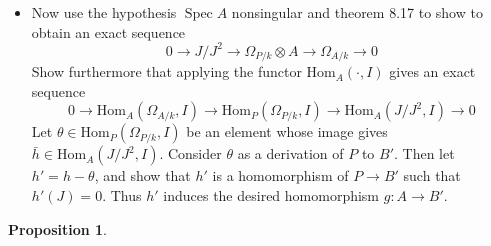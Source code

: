 \documentclass[a4paper]{amsart}
\theoremstyle{definition}
\theoremstyle{plain}
\newtheorem{prop}{Proposition}[subsection]
\DeclareMathOperator{\spec}{Spec}
\renewcommand{\hom}{\text{Hom}}
\begin{document}
\begin{itemize}
\begin{proof}
	\end{proof}
	\item Now use the hypothesis $\spec A$ nonsingular and theorem 8.17 to show to obtain an exact sequence
	\[
	0 \to J/J^2 \to \Omega_{P/k} \otimes A \to \Omega_{A/k} \to 0
	\]
	Show furthermore that applying the functor $\hom_A(\cdot, I)$ gives an exact sequence
	\[
	0 \to \hom_A(\Omega_{A/k},I) \to \hom_{P}(\Omega_{P/k},I) \to \hom_A(J/J^2,I) \to 0
	\]
	Let $\theta \in \hom_P(\Omega_{P/k},I)$ be an element whose image gives $ \bar{h} \in \hom_A(J/J^2,I)$. Consider $\theta$ as a derivation of $P$ to $B'$. Then let $h'= h - \theta$, and show that $h'$ is a homomorphism of $P \to B'$ such that $h'(J)=0$. Thus $h'$ induces the desired homomorphism $g \colon A \to B'$.
	\end{itemize}
\begin{prop}

\end{prop}
\end{document}
